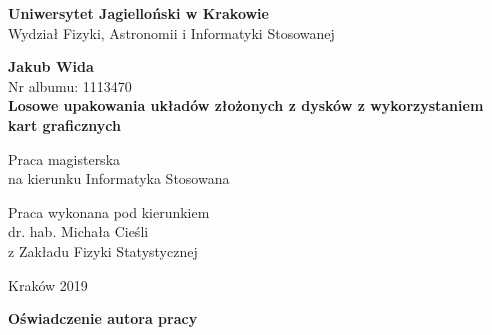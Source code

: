 \documentclass[12pt, oneside]{report}
\begin{document}
\thispagestyle{empty}
\begin{titlepage}
    \begin{center}

           \Large
	\textbf{Uniwersytet Jagielloński w Krakowie}\vspace{0.2cm}\\ Wydział Fizyki, Astronomii i Informatyki Stosowanej
               \vspace*{1cm}

         \vspace{3cm}
         \Large
          \textbf{Jakub Wida}\\\vspace{0.5cm}
         \normalsize Nr albumu: 1113470\\
             \vspace{2cm}
        \Huge
        \textbf{Losowe upakowania układów złożonych z dysków z wykorzystaniem kart graficznych}

        \vspace{1.5cm}
        \normalsize
        Praca magisterska\\
        na kierunku Informatyka Stosowana\\ \vspace{0.15cm}

        \vfill
        \vspace{2cm}
       \begin{minipage}{1\textwidth}
\begin{flushright}
Praca wykonana pod kierunkiem\\
dr. hab. Michała Cieśli\\
z Zakładu Fizyki Statystycznej
\end{flushright}
\end{minipage}

        \vspace{2cm}
        \begin{center}
      Kraków 2019
        \end{center}
    \end{center}
\end{titlepage}

\newpage
 \thispagestyle{empty}
\vspace{2.5cm}
\begin{flushleft}
\large \textbf{Oświadczenie autora pracy}\vspace{0.6cm}\\
\end{flushleft}
\end{document}
